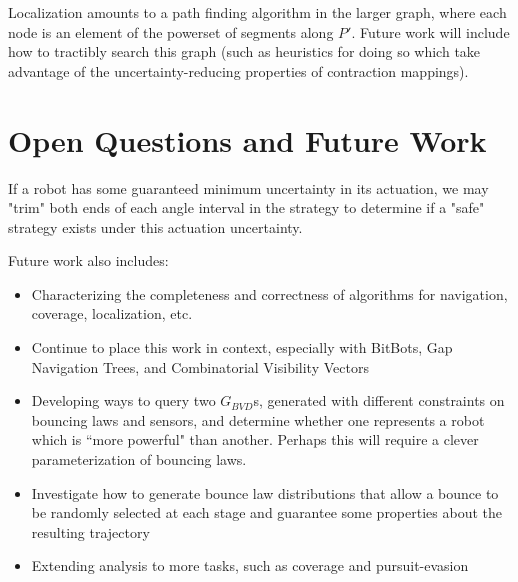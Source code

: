\documentclass[]{svproc}  %
\begin{document}
Localization amounts to a path finding algorithm in the larger graph, where each
node is an element of the powerset of segments along $P'$. Future work will
include how to tractibly search this graph (such as heuristics for doing so
which take advantage of the uncertainty-reducing properties of contraction
mappings).


\section{Open Questions and Future Work}

If a robot has some guaranteed minimum uncertainty in its actuation, we may
"trim" both ends of each angle interval in the strategy to determine if a "safe"
strategy exists under this actuation uncertainty.


Future work also includes:

\begin{itemize}
\item Characterizing the completeness and correctness of algorithms for
navigation, coverage, localization, etc.
\item Continue to place this work in context, especially with BitBots, Gap
Navigation Trees, and Combinatorial Visibility Vectors
\item Developing ways to query two $G_{BVD}$s, generated with different constraints on
 bouncing laws and sensors, and determine whether one represents a robot which
is ``more powerful" than another. Perhaps this will require a clever
parameterization of bouncing laws.
\item Investigate how to generate bounce law distributions that allow a bounce
to be randomly selected at each stage and guarantee some properties about the
resulting trajectory
\item Extending analysis to more tasks, such as coverage and pursuit-evasion
\end{itemize}
\end{document}
